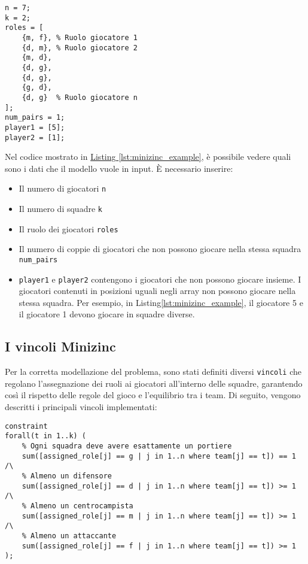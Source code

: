 \documentclass{article}
\begin{document}
\begin{multicols*}{2}
\begin{lstlisting}[style=minizinc, caption={Esempio di input MiniZinc}, label={lst:minizinc_example}]
n = 7;
k = 2;
roles = [
    {m, f}, % Ruolo giocatore 1
    {d, m}, % Ruolo giocatore 2
    {m, d},
    {d, g},
    {d, g},
    {g, d},
    {d, g}  % Ruolo giocatore n
];
num_pairs = 1;
player1 = [5];
player2 = [1];
\end{lstlisting}
Nel codice mostrato in \href{#lst:minizinc_example}{Listing \ref{lst:minizinc_example}}, è possibile vedere quali sono i dati che il modello vuole in input. È necessario inserire:
\begin{itemize}
    \item Il numero di giocatori \texttt{n}
    \item Il numero di squadre \texttt{k}
    \item Il ruolo dei giocatori \texttt{roles}
    \item Il numero di coppie di giocatori che non possono giocare nella stessa squadra \texttt{num\_pairs}
    \item \texttt{player1} e \texttt{player2} contengono i giocatori che non possono giocare insieme. I giocatori contenuti in posizioni uguali negli array non possono giocare nella stessa squadra. Per esempio, in {Listing\ref{lst:minizinc_example}}, il giocatore 5 e il giocatore 1 devono giocare in squadre diverse.
\end{itemize}

\subsection{I vincoli Minizinc}
Per la corretta modellazione del problema, sono stati definiti diversi \texttt{vincoli} che regolano l'assegnazione dei ruoli ai giocatori all'interno delle squadre, garantendo così il rispetto delle regole del gioco e l'equilibrio tra i team. Di seguito, vengono descritti i principali vincoli implementati:


\begin{lstlisting}[style=minizinc, caption={Vincolo 1 Minizinc}, label={lst:minizinc_vincolo}]
constraint
forall(t in 1..k) (
    % Ogni squadra deve avere esattamente un portiere
    sum([assigned_role[j] == g | j in 1..n where team[j] == t]) == 1 /\
    % Almeno un difensore
    sum([assigned_role[j] == d | j in 1..n where team[j] == t]) >= 1 /\
    % Almeno un centrocampista
    sum([assigned_role[j] == m | j in 1..n where team[j] == t]) >= 1 /\
    % Almeno un attaccante
    sum([assigned_role[j] == f | j in 1..n where team[j] == t]) >= 1
);
\end{lstlisting}


\end{multicols*}
\end{document}
